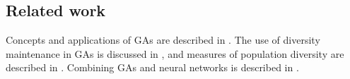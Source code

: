 \subsection{Related work}
Concepts and applications of GAs are described in \cite{Cobb93geneticalgorithms,DeJong:1975:ABC:907087,Luke2013Metaheuristics,Syswerda:1989:UCG:645512.657265,ursem2002diversity,fogarty,Whitley:1989:GAS:93126.93169,1250187}. The use of diversity maintenance in GAs is discussed in \cite{diaz2007empirical,Zitzler00comparisonof,Darwen00doesextra,1266373}, and measures of population diversity are described in \cite{Nguyen:2006:ASPGP,simpson1949measurement}. Combining GAs and neural networks is described in \cite{masterThesisGANN}.

